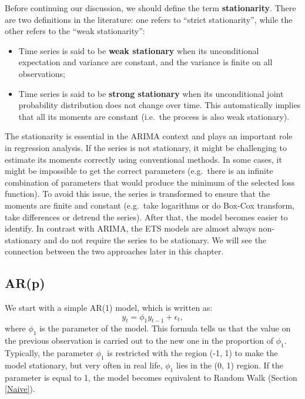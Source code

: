 \documentclass[]{book}
\providecommand{\tightlist}{%
  \setlength{\itemsep}{0pt}\setlength{\parskip}{0pt}}
\theoremstyle{definition}
\theoremstyle{definition}
\theoremstyle{definition}
\theoremstyle{definition}
\theoremstyle{remark}
\begin{document}
Before continuing our discussion, we should define the term \textbf{stationarity}. There are two definitions in the literature: one refers to ``strict stationarity'', while the other refers to the ``weak stationarity'':

\begin{itemize}
\tightlist
\item
  Time series is said to be \textbf{weak stationary} when its unconditional expectation and variance are constant, and the variance is finite on all observations;
\item
  Time series is said to be \textbf{strong stationary} when its unconditional joint probability distribution does not change over time. This automatically implies that all its moments are constant (i.e.~the process is also weak stationary).
\end{itemize}

The stationarity is essential in the ARIMA context and plays an important role in regression analysis. If the series is not stationary, it might be challenging to estimate its moments correctly using conventional methods. In some cases, it might be impossible to get the correct parameters (e.g.~there is an infinite combination of parameters that would produce the minimum of the selected loss function). To avoid this issue, the series is transformed to ensure that the moments are finite and constant (e.g.~take logarithms or do Box-Cox transform, take differences or detrend the series). After that, the model becomes easier to identify. In contrast with ARIMA, the ETS models are almost always non-stationary and do not require the series to be stationary. We will see the connection between the two approaches later in this chapter.

\hypertarget{AR}{%
\subsection{AR(p)}\label{AR}}

We start with a simple AR(1) model, which is written as:
\begin{equation}
  {y}_{t} = \phi_1 y_{t-1} + \epsilon_t ,
  \label{eq:ARIMA100Example}
\end{equation}
where \(\phi_1\) is the parameter of the model. This formula tells us that the value on the previous observation is carried out to the new one in the proportion of \(\phi_1\). Typically, the parameter \(\phi_1\) is restricted with the region (-1, 1) to make the model stationary, but very often in real life, \(\phi_1\) lies in the (0, 1) region. If the parameter is equal to 1, the model becomes equivalent to Random Walk (Section \ref{Naive}).
\end{document}
